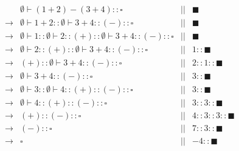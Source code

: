 \[
\begin{array}{lrcr}
& \emptyset\vdash(1+2)-(3+4)::\square &||& \blacksquare \\
\rightarrow & \emptyset\vdash1+2::\emptyset\vdash3+4::(-)::\square &||&
\blacksquare \\
\rightarrow &
\emptyset\vdash1::\emptyset\vdash2::(+)::\emptyset\vdash3+4::(-)::\square &||&
\blacksquare \\
\rightarrow & \emptyset\vdash2::(+)::\emptyset\vdash3+4::(-)::\square &||&
1::\blacksquare \\
\rightarrow & (+)::\emptyset\vdash3+4::(-)::\square &||& 2::1::\blacksquare \\
\rightarrow & \emptyset\vdash3+4::(-)::\square &||& 3::\blacksquare \\
\rightarrow & \emptyset\vdash3::\emptyset\vdash4::(+)::(-)::\square &||&
3::\blacksquare \\
\rightarrow & \emptyset\vdash4::(+)::(-)::\square &||& 3::3::\blacksquare \\
\rightarrow & (+)::(-)::\square &||& 4::3::3::\blacksquare \\
\rightarrow & (-)::\square &||& 7::3::\blacksquare \\
\rightarrow & \square &||& -4::\blacksquare \\
\end{array}
\]

